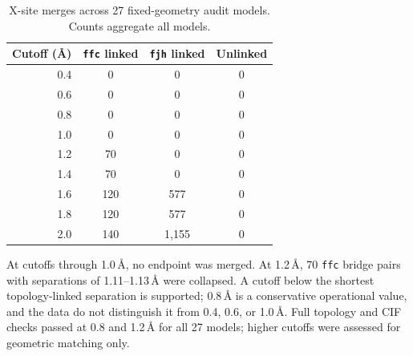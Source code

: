 \documentclass[a5paper, 10pt]{article}
\begin{document}
\begin{table}[ht]
\centering
\scriptsize
\setlength{\tabcolsep}{3pt}
\caption{X-site merges across 27 fixed-geometry audit models. Counts aggregate all models.}
\label{tab:x-fusion-sensitivity}
\begin{tabular}{rccc}
\hline
Cutoff (\AA) & \texttt{ffc} linked & \texttt{fjh} linked & Unlinked \\
\hline
0.4 & 0 & 0 & 0 \\
0.6 & 0 & 0 & 0 \\
0.8 & 0 & 0 & 0 \\
1.0 & 0 & 0 & 0 \\
1.2 & 70 & 0 & 0 \\
1.4 & 70 & 0 & 0 \\
1.6 & 120 & 577 & 0 \\
1.8 & 120 & 577 & 0 \\
2.0 & 140 & 1,155 & 0 \\
\hline
\end{tabular}
\end{table}

At cutoffs through 1.0\,\AA{}, no endpoint was merged. At 1.2\,\AA{}, 70 \texttt{ffc} bridge pairs with separations of 1.11--1.13\,\AA{} were collapsed. A cutoff below the shortest topology-linked separation is supported; 0.8\,\AA{} is a conservative operational value, and the data do not distinguish it from 0.4, 0.6, or 1.0\,\AA{}. Full topology and CIF checks passed at 0.8 and 1.2\,\AA{} for all 27 models; higher cutoffs were assessed for geometric matching only.
\end{document}

